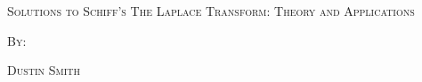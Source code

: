 \documentclass[dvipsnames,svgnames,x11names]{scrbook}%
\begin{document}
\pagecolor{PaleGreen1}
\begin{center}
  \begin{center}
  \vspace*{\fill}
  \textsc{\LARGE Solutions to Schiff's The Laplace Transform: Theory and
    Applications}
  \par\bigskip
  \textsc{By:}
  \par\bigskip
  \textsc{\LARGE Dustin Smith}
  \vspace*{\fill}
\end{center}
\end{center}

\newpage

\tableofcontents

\newpage


\end{document}
